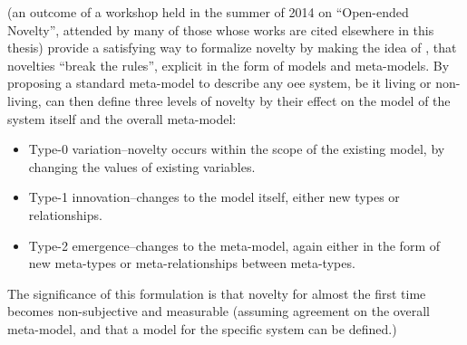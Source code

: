\begin{NOTES}
\Cite{BanzhafBaumgaertnerBeslonEtAl2016} (an outcome of a workshop held in the summer of 2014 on ``Open-ended Novelty'', attended by many of those whose works are cited elsewhere in this thesis) provide a satisfying way to formalize novelty by making the idea of \cite{Boden2004}, that novelties ``break the rules'', explicit in the form of models and meta-models. By proposing a standard meta-model to describe any \gls{oee} system, be it living or non-living, \cite{BanzhafBaumgaertnerBeslonEtAl2016} can then define three levels of novelty by their effect on the model of the system itself and the overall meta-model:

\begin{itemize}
	\item Type-0 variation--novelty occurs within the scope of the existing model, by changing the values of existing variables.
	\item Type-1 innovation--changes to the model itself, either new types or relationships.
	\item Type-2 emergence--changes to the meta-model, again either in the form of new meta-types or meta-relationships between meta-types.
\end{itemize}
	
The significance of this formulation is that novelty for almost the first time becomes non-subjective and measurable (assuming agreement on the overall meta-model, and that a model for the specific system can be defined.)
\end{NOTES}

